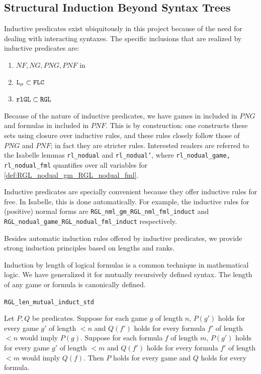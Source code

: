 \subsection{Structural Induction Beyond Syntax Trees}
Inductive predicates exist ubiquitously in this project because of the need for dealing with interacting syntaxes. The specific inclusions that are realized by inductive predicates are:

\begin{enumerate}
    \item $NF, NG, PNG, PNF$ in \RGL{}
    \item $\texttt{L}_\mu{} \subset \texttt{FLC}{}$
    \item $\texttt{rlGL}{} \subset \texttt{RGL}{}$
\end{enumerate}

Because of the nature of inductive predicates, we have games in \rlGL{} included in $PNG$ and formulas in \rlGL{} included in $PNF$. This is by construction: one constructs these sets using closure over inductive rules, and these rules closely follow those of $PNG$ and $PNF$; in fact they are stricter rules. Interested readers are referred to the Isabelle lemmas \texttt{rl\_nodual} and \texttt{rl\_nodual'}, where \texttt{rl\_nodual\_game, rl\_nodual\_fml} quantifies over all variables for \autoref{def:RGL_nodual_gm_RGL_nodual_fml}.

Inductive predicates are specially convenient because they offer inductive rules for free. In Isabelle, this is done automatically. For example, the inductive rules for (positive) normal forms are \texttt{RGL\_nml\_gm\_RGL\_nml\_fml\_induct} and \texttt{RGL\_nodual\_game\_RGL\_nodual\_fml\_induct} respectively.

Besides automatic induction rules offered by inductive predicates, we provide strong induction principles based on lengths and ranks.

Induction by length of logical formulas is a common technique in mathematical logic. We have generalized it for mutually recursively defined \RGL{} syntax. The length of any \RGL{} game or formula is canonically defined.

\begin{blemma}
\texttt{RGL\_len\_mutual\_induct\_std}

    Let $P,Q$ be predicates. Suppose for each game $g$ of length $n$, $P(g')$ holds for every game $g'$ of length $<n$ and $Q(f')$ holds for every formula $f'$ of length $<n$ would imply $P(g)$. Suppose for each formula $f$ of length $m$, $P(g')$ holds for every game $g'$ of length $<m$ and $Q(f')$ holds for every formula $f'$ of length $<m$ would imply $Q(f)$. Then $P$ holds for every \RGL{} game and $Q$ holds for every \RGL{} formula.
\end{blemma}

